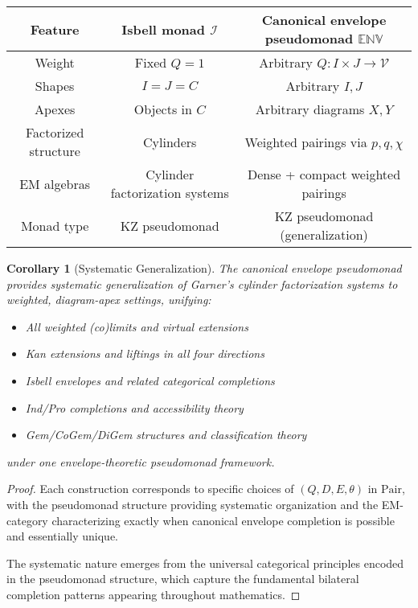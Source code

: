 \documentclass[11pt]{article}
\theoremstyle{plain}
\newtheorem{corollary}[theorem]{Corollary}
\theoremstyle{definition}
\theoremstyle{remark}
\newcommand{\V}{\mathcal{V}}
\newcommand{\Pair}{\mathrm{Pair}}
\begin{document}
\begin{center}
\begin{tabular}{|c|c|c|}
\hline
\textbf{Feature} & \textbf{Isbell monad $\mathcal{I}$} & \textbf{Canonical envelope pseudomonad $\mathbb{ENV}$} \\
\hline
Weight & Fixed $Q = 1$ & Arbitrary $Q : I \times J \to \V$ \\
\hline
Shapes & $I = J = C$ & Arbitrary $I, J$ \\
\hline
Apexes & Objects in $C$ & Arbitrary diagrams $X, Y$ \\
\hline
Factorized structure & Cylinders & Weighted pairings via $p, q, \chi$ \\
\hline
EM algebras & Cylinder factorization systems & Dense + compact weighted pairings \\
\hline
Monad type & KZ pseudomonad & KZ pseudomonad (generalization) \\
\hline
\end{tabular}
\end{center}

\begin{corollary}[Systematic Generalization]
The canonical envelope pseudomonad provides systematic generalization of Garner's cylinder factorization systems to weighted, diagram-apex settings, unifying:
\begin{itemize}
\item All weighted (co)limits and virtual extensions
\item Kan extensions and liftings in all four directions
\item Isbell envelopes and related categorical completions
\item Ind/Pro completions and accessibility theory
\item Gem/CoGem/DiGem structures and classification theory
\end{itemize}
under one envelope-theoretic pseudomonad framework.
\end{corollary}

\begin{proof}
Each construction corresponds to specific choices of $(Q, D, E, \theta)$ in $\Pair$, with the pseudomonad structure providing systematic organization and the EM-category characterizing exactly when canonical envelope completion is possible and essentially unique.

The systematic nature emerges from the universal categorical principles encoded in the pseudomonad structure, which capture the fundamental bilateral completion patterns appearing throughout mathematics.
\end{proof}
\end{document}
